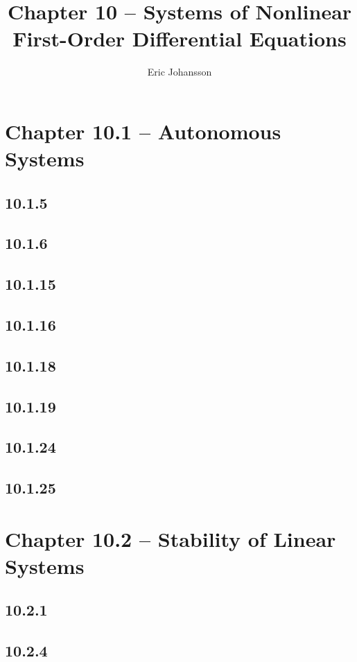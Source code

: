 \documentclass{article}
\title{Chapter 10 -- Systems of Nonlinear First-Order Differential Equations}
\author{Eric Johansson}
\begin{document}
\maketitle
\tableofcontents
\newpage



\section{Chapter 10.1 -- Autonomous Systems}

\subsection{10.1.5}
\subsection{10.1.6}
\subsection{10.1.15}
\subsection{10.1.16}
\subsection{10.1.18}
\subsection{10.1.19}
\subsection{10.1.24}
\subsection{10.1.25}

\section{Chapter 10.2 -- Stability of Linear Systems}

\subsection{10.2.1}
\subsection{10.2.4}
\end{document}
